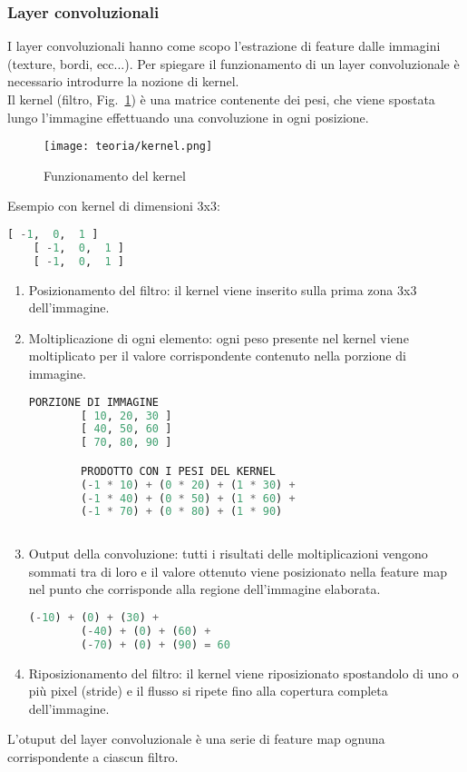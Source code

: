 \subsubsection{Layer convoluzionali}
I layer convoluzionali hanno come scopo l'estrazione di feature dalle immagini (texture, bordi, ecc...).
Per spiegare il funzionamento di un layer convoluzionale è necessario introdurre la nozione di kernel.\\Il kernel (filtro, Fig.~\ref{fig:kernel}) è una matrice contenente dei pesi, che viene spostata lungo l'immagine effettuando una convoluzione in ogni posizione.

\begin{figure}[!h] 
    \centering 
    \texttt{[image: teoria/kernel.png]} 
    \caption{Funzionamento del kernel}
    \label{fig:kernel}
  \end{figure}
Esempio con kernel di dimensioni 3x3:

\begin{lstlisting}[language=Python, frame=none]
    [ -1,  0,  1 ]
    [ -1,  0,  1 ]
    [ -1,  0,  1 ]
\end{lstlisting}


\begin{enumerate}
    \item Posizionamento del filtro: il kernel viene inserito sulla prima zona 3x3 dell'immagine.
    \item Moltiplicazione di ogni elemento: ogni peso presente nel kernel viene moltiplicato per il valore corrispondente contenuto nella porzione di immagine.
    \newpage
    \begin{lstlisting}[language=Python, frame=none]
        PORZIONE DI IMMAGINE
        [ 10, 20, 30 ]
        [ 40, 50, 60 ]
        [ 70, 80, 90 ]

        PRODOTTO CON I PESI DEL KERNEL
        (-1 * 10) + (0 * 20) + (1 * 30) +
        (-1 * 40) + (0 * 50) + (1 * 60) +
        (-1 * 70) + (0 * 80) + (1 * 90)
            
    \end{lstlisting}
    \item Output della convoluzione: tutti i risultati delle moltiplicazioni vengono sommati tra di loro e il valore ottenuto viene posizionato nella feature map nel punto che corrisponde alla regione dell'immagine elaborata.
    \begin{lstlisting}[language=Python, frame=none]
        (-10) + (0) + (30) +
        (-40) + (0) + (60) +
        (-70) + (0) + (90) = 60
    \end{lstlisting}
    \item Riposizionamento del filtro: il kernel viene riposizionato spostandolo di uno o più pixel (stride) e il flusso si ripete fino alla copertura completa dell'immagine.
\end{enumerate}
L'otuput del layer convoluzionale è una serie di feature map ognuna corrispondente a ciascun filtro.

